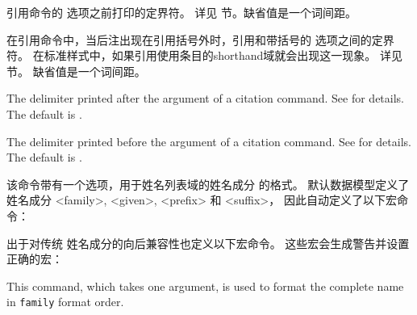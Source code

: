 \begin{ltxsyntax}
引用命令的  选项之前打印的定界符。
详见  节。缺省值是一个词间距。

在引用命令中，当后注出现在引用括号外时，引用和带括号的  选项之间的定界符。
在标准样式中，如果引用使用条目的shorthand域就会出现这一现象。
详见  节。
缺省值是一个词间距。

\CSdelimMark
The delimiter printed after the  argument of a citation command. See  for details. The default is .

\CSdelimMark
The delimiter printed before the  argument of a citation command. See  for details. The default is .

该命令带有一个选项，用于姓名列表域的姓名成分  的格式。
默认数据模型定义了姓名成分 <family>, <given>, <prefix> 和 <suffix>，
因此自动定义了以下宏命令：

\begin{ltxexample}
\mkbibnamefamily
\mkbibnamegiven
\mkbibnameprefix
\mkbibnamesuffix
\end{ltxexample}
%
出于对传统 \BibTeX 姓名成分的向后兼容性也定义以下宏命令。
这些宏会生成警告并设置正确的宏：

\begin{ltxexample}
\mkbibnamelast
\mkbibnamefirst
\mkbibnameaffix
\end{ltxexample}

This command, which takes one argument, is used to format the complete name in \texttt{family} format order.


\end{ltxsyntax}
